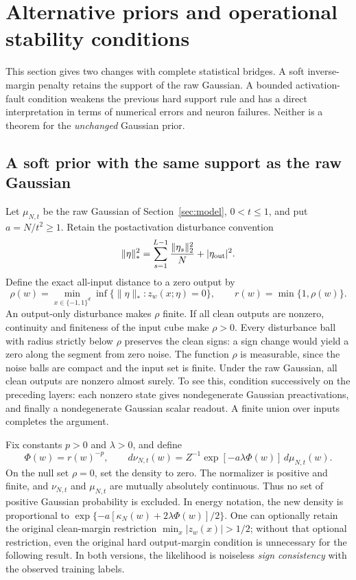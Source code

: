 \section{Alternative priors and operational stability conditions}
\label{sec:alternative-priors}

This section gives two changes with complete statistical bridges. A soft
inverse-margin penalty retains the support of the raw Gaussian. A bounded
activation-fault condition weakens the previous hard support rule and has a
direct interpretation in terms of numerical errors and neuron failures.
Neither is a theorem for the \emph{unchanged} Gaussian prior.

\subsection{A soft prior with the same support as the raw Gaussian}

Let $\mu_{N,t}$ be the raw Gaussian of Section~\ref{sec:model}, $0<t\le1$,
and put $a=N/t^2\ge1$. Retain the postactivation disturbance convention
\[
 \|\eta\|_*^2=\sum_{s=1}^{L-1}\frac{\|\eta_s\|_2^2}{N}
                         +|\eta_{\rm out}|^2.
\]
Define the exact all-input distance to a zero output by
\[
 \rho(w)=\min_{x\in\{-1,1\}^d}
       \inf\{\|\eta\|_*:z_w(x;\eta)=0\},\qquad
 r(w)=\min\{1,\rho(w)\}.
\]
An output-only disturbance makes $\rho$ finite. If all clean outputs are
nonzero, continuity and finiteness of the input cube make $\rho>0$.
Every disturbance ball with radius strictly below $\rho$ preserves the clean
signs: a sign change would yield a zero along the segment from zero noise.
The function $\rho$ is measurable, since the noise balls are compact and
the input set is finite. Under the raw Gaussian, all clean outputs are
nonzero almost surely. To see this, condition successively on the preceding
layers: each nonzero state gives nondegenerate Gaussian preactivations,
and finally a nondegenerate Gaussian scalar readout. A finite union over
inputs completes the argument.

Fix constants $p>0$ and $\lambda>0$, and define
\begin{equation}\label{eq:soft-margin-prior}
 \Phi(w)=r(w)^{-p},\qquad
 d\nu_{N,t}(w)=Z^{-1}\exp[-a\lambda\Phi(w)]\,d\mu_{N,t}(w).
\end{equation}
On the null set $\rho=0$, set the density to zero. The normalizer is positive
and finite, and $\nu_{N,t}$ and $\mu_{N,t}$ are mutually absolutely
continuous. Thus no set of positive Gaussian probability is excluded.
In energy notation, the new density is proportional to
$\exp\{-a[\kappa_N(w)+2\lambda\Phi(w)]/2\}$.
One can optionally retain the original clean-margin restriction
$\min_x|z_w(x)|>1/2$; without that optional restriction, even the original
hard output-margin condition is unnecessary for the following result.
In both versions, the likelihood is noiseless \emph{sign consistency} with
the observed training labels.

